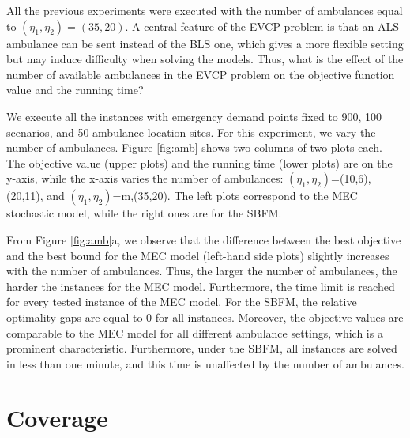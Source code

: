  All the previous experiments were executed with the number of ambulances equal to $(\eta_1,\eta_2)=   (35,20) $. A central feature of the EVCP problem is that an ALS ambulance can be sent instead of the BLS one, which gives a more flexible setting but may induce difficulty when solving the models. 
 Thus, what is the effect of the number of available ambulances in the EVCP problem on the objective function value and the running time?

  
 We execute all the instances with emergency demand points fixed to 900, 100 scenarios, and 50 ambulance location sites. For this experiment, we vary the number of ambulances. Figure \ref{fig:amb} shows two columns of two plots each. The objective value (upper plots) and the running time (lower plots) are on the y-axis, while the x-axis varies the number of ambulances: $(\eta_1,\eta_2)$=(10,6), (20,11), and  $(\eta_1,\eta_2)$=m,(35,20). The left plots correspond to the MEC stochastic model, while the right ones are for the SBFM. 

 From Figure \ref{fig:amb}a, we observe that the difference between the best objective and the best bound for the MEC model (left-hand side plots) slightly increases with the number of ambulances. Thus, the larger the number of ambulances, the harder the instances for the MEC model. Furthermore, the time limit is reached for every tested instance of the MEC model. For the SBFM, the relative optimality gaps are equal to 0 for all instances. Moreover, the objective values are comparable to the MEC model for all different ambulance settings, which is a prominent characteristic. Furthermore, under the SBFM, all instances are solved in less than one minute, and this time is unaffected by the number of ambulances.  


\section{Coverage}




